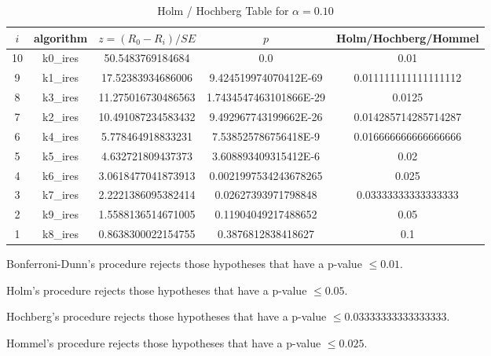 \documentclass[a4paper,10pt]{article}
\begin{document}
\begin{landscape}
\begin{table}[!htp]
\centering\tiny
\caption{Holm / Hochberg Table for $\alpha=0.10$}
\begin{tabular}{ccccc}
$i$&algorithm&$z=(R_0 - R_i)/SE$&$p$&Holm/Hochberg/Hommel\\
\hline
10&k0_ires&50.5483769184684&0.0&0.01\\
9&k1_ires&17.52383934686006&9.424519974070412E-69&0.011111111111111112\\
8&k3_ires&11.275016730486563&1.7434547463101866E-29&0.0125\\
7&k2_ires&10.491087234583432&9.492967743199662E-26&0.014285714285714287\\
6&k4_ires&5.778464918833231&7.538525786756418E-9&0.016666666666666666\\
5&k5_ires&4.632721809437373&3.608893409315412E-6&0.02\\
4&k6_ires&3.0618477041873913&0.0021997534243678265&0.025\\
3&k7_ires&2.2221386095382414&0.02627393971798848&0.03333333333333333\\
2&k9_ires&1.5588136514671005&0.11904049217488652&0.05\\
1&k8_ires&0.8638300022154755&0.3876812838418627&0.1\\
\hline
\end{tabular}
\end{table}
Bonferroni-Dunn's procedure rejects those hypotheses that have a p-value $\le0.01$.


Holm's procedure rejects those hypotheses that have a p-value $\le0.05$.


Hochberg's procedure rejects those hypotheses that have a p-value $\le0.03333333333333333$.


Hommel's procedure rejects those hypotheses that have a p-value $\le0.025$.



\end{landscape}
\end{document}
